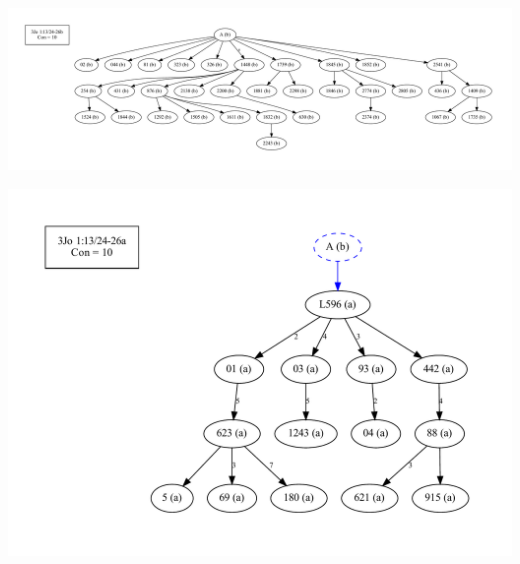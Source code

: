 \documentclass[10pt]{beamer}
\begin{document}
	\begin{frame}
		\begin{center}
			\includegraphics[width=\textwidth]{../img/B25K1V13U24-26Rb-coherence-attestations-b-initial.pdf}
		\end{center}
	\end{frame}
	\begin{frame}
		\begin{center}
			\includegraphics[width=\textwidth]{../img/B25K1V13U24-26Ra-coherence-attestations-b-initial.pdf}
		\end{center}
	\end{frame}
\end{document}
